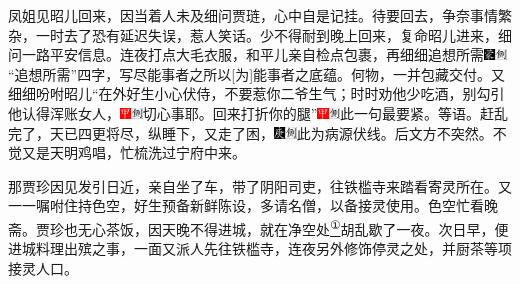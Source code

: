 凤姐见昭儿回来，因当着人未及细问贾琏，心中自是记挂。待要回去，争奈事情繁杂，一时去了恐有延迟失误，惹人笑话。少不得耐到晚上回来，复命昭儿进来，细问一路平安信息。连夜打点大毛衣服，和平儿亲自检点包裹，再细细追想所需{\includegraphics[width=3mm]{../Images/00006}\includegraphics[width=3mm]{../Images/00011}\footnotesize \kaishu ``追想所需''四字，写尽能事者之所以{[}为{]}能事者之底蕴。}何物，一并包藏交付。又细细吩咐昭儿``在外好生小心伏侍，不要惹你二爷生气；时时劝他少吃酒，别勾引他认得浑账女人，{\includegraphics[width=3mm]{../Images/00002}\includegraphics[width=3mm]{../Images/00011}\footnotesize \kaishu 切心事耶。}回来打折你的腿''{\includegraphics[width=3mm]{../Images/00002}\includegraphics[width=3mm]{../Images/00011}\footnotesize \kaishu 此一句最要紧。}等语。赶乱完了，天已四更将尽，纵睡下，又走了困，{\includegraphics[width=3mm]{../Images/00004}\includegraphics[width=3mm]{../Images/00011}\footnotesize \kaishu 此为病源伏线。后文方不突然。}不觉又是天明鸡唱，忙梳洗过宁府中来。

那贾珍因见发引日近，亲自坐了车，带了阴阳司吏，往铁槛寺来踏看寄灵所在。又一一嘱咐住持色空，好生预备新鲜陈设，多请名僧，以备接灵使用。色空忙看晚斋。贾珍也无心茶饭，因天晚不得进城，就在净空处\href{../Text/part0018_split_000.html\#lnkback_1_a}{\textsuperscript{①}}胡乱歇了一夜。次日早，便进城料理出殡之事，一面又派人先往铁槛寺，连夜另外修饰停灵之处，并厨茶等项接灵人口。

